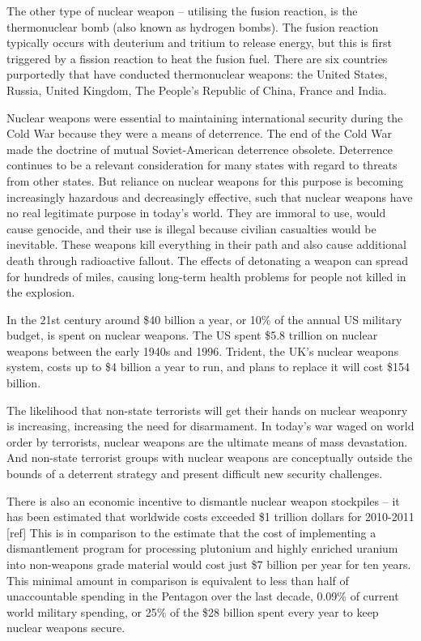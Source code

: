 \documentclass[twocolumn,a4paper]{article}
\begin{document}
The other type of nuclear weapon -- utilising the fusion reaction, is
the thermonuclear bomb (also known as hydrogen bombs).  The fusion
reaction typically occurs with deuterium and tritium to release
energy, but this is first triggered by a fission reaction to heat the
fusion fuel.  There are six countries purportedly that have conducted
thermonuclear weapons: the United States, Russia, United Kingdom, The
People's Republic of China, France and India.

Nuclear weapons were essential to maintaining international security
during the Cold War because they were a means of deterrence. The end
of the Cold War made the doctrine of mutual Soviet-American deterrence
obsolete.  Deterrence continues to be a relevant consideration for
many states with regard to threats from other states. But reliance on
nuclear weapons for this purpose is becoming increasingly hazardous
and decreasingly effective, such that nuclear weapons have no real
legitimate purpose in today’s world.  They are immoral to use, would
cause genocide, and their use is illegal because civilian casualties
would be inevitable. These weapons kill everything in their path and
also cause additional death through radioactive fallout. The effects
of detonating a weapon can spread for hundreds of miles, causing
long-term health problems for people not killed in the explosion.

In the 21st century around \$40 billion a year, or 10\% of the annual
US military budget, is spent on nuclear weapons. The US spent \$5.8
trillion on nuclear weapons between the early 1940s and 1996. Trident,
the UK’s nuclear weapons system, costs up to \$4 billion a year to
run, and plans to replace it will cost \$154 billion.

The likelihood that non-state terrorists will get their hands on
nuclear weaponry is increasing, increasing the need for
disarmament. In today's war waged on world order by terrorists,
nuclear weapons are the ultimate means of mass devastation. And
non-state terrorist groups with nuclear weapons are conceptually
outside the bounds of a deterrent strategy and present difficult new
security challenges.

There is also an economic incentive to dismantle nuclear weapon
stockpiles -- it has been estimated that worldwide costs exceeded \$1
trillion dollars for 2010-2011 [ref] This is in comparison to the
estimate that the cost of implementing a dismantlement program for
processing plutonium and highly enriched uranium into non-weapons
grade material would cost just \$7 billion per year for ten
years. This minimal amount in comparison is equivalent to less than
half of unaccountable spending in the Pentagon over the last decade,
0.09\% of current world military spending, or 25\% of the \$28 billion
spent every year to keep nuclear weapons secure.
\end{document}
